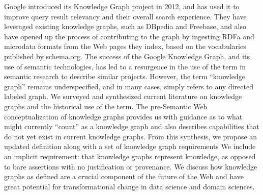 Google introduced its Knowledge Graph project in 2012, and has used it to improve query result relevancy and their overall search experience.
They have leveraged existing knowledge graphs, such as DBpedia and Freebase, and also have opened up the process of contributing to the graph by ingesting RDFa and microdata formats from the Web pages they index, based on the vocabularies published by schema.org.
The success of the Google Knowledge Graph, and its use of semantic technologies, has led to a resurgence in the use of the term in semantic research to describe similar projects.
However, the term ``knowledge graph'' remains underspecified, and in many cases, simply refers to any directed labeled graph.
We surveyed and synthesized current literature on knowledge graphs and the historical use of the term.  
The pre-Semantic Web conceptualization of knowledge graphs provides us with guidance as to what might currently ``count'' as a knowledge graph and also describes capabilities that do not yet exist in current knowledge graphs.
From this synthesis, we propose an updated definition along with a set of knowledge graph requirements  We include an implicit requirement: that knowledge graphs represent knowledge, as opposed to bare assertions with no justification or provenance.
We discuss how knowledge graphs as defined are a crucial component of the future of the Web and have great potential for transformational change in data science and domain sciences.

